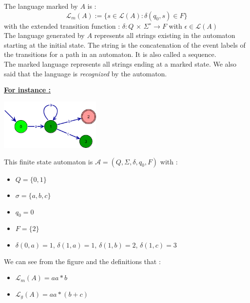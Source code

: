 The language marked by $A$ is :
\begin{equation}
\mathcal{L}_m(A) := \{ s \in \mathcal{L}(A) : \delta(q_0, s) \in F\}
\end{equation}
with the extended transition function : $\delta : Q$ × $\Sigma ^{∗} \rightarrow F $ with $\epsilon \in \mathcal{L}(A)$\\

The language generated by $A$ represents all strings existing in the automaton starting at the initial state. The string is the concatenation of the event labels of the transitions for a path in an automaton. It is also called a sequence.\\
The marked language represents all strings ending at a marked state. We also said that the language is \textit{recognized} by the automaton.

\textbf{\underline{For instance :}} \\
      \begin{center}
      \includegraphics[width = 5cm]{./IV/ex2.png}
      \end{center}
      
This finite state automaton is $\mathcal{A} = (Q, \Sigma,\delta,q_0,F )$  with :
\begin{itemize}
\item $Q=\{0,1\}$
\item $\sigma = \{a,b,c\}$
\item $q_0 = {0} $
\item $F=\{2\}$
\item $\delta(0,a)=1$, $\delta(1,a)=1$, $\delta(1,b)=2$, $\delta(1,c)=3$
\end{itemize}

We can see from the figure and the definitions that :
\begin{itemize}
\item $\mathcal{L}_m (A)=aa*b$
\item $\mathcal{L}_g (A)=aa*(b+c)$
\end{itemize}



